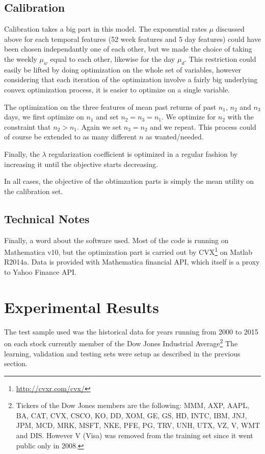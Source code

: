 \documentclass[11pt,fleqn]{article}
\begin{document}
\subsection{Calibration}

Calibration takes a big part in this model. The exponential rates $\mu$ discussed above
for each temporal features (52 week features and 5 day features) could have been chosen
independantly one of each other, but we made the choice of taking the weekly $\mu_w$ equal
to each other, likewise for the day $\mu_d$. This restriction could easily be lifted by
doing optimization on the whole set of variables, however considering that each iteration
of the optimization involve a fairly big underlying convex optimization process, it is
easier to optimize on a single variable.

The optimization on the three features of mean past returns of past $n_1$, $n_2$ and $n_3$
days, we first optimize on $n_1$ and set $n_2=n_3=n_1$. We optimize for $n_2$ with the
constraint that $n_2>n_1$. Again we set $n_3=n_2$ and we repeat. This process could of
course be extended to as many different $n$ as wanted/needed. 

Finally, the $\lambda$ regularization coefficient is optimized in a regular fashion by
increasing it until the objective starts decreasing. 

In all cases, the objective of the obtimzation parts is simply the mean utility on the
calibration set.



\subsection{Technical Notes}

Finally, a word about the software used. Most of the code is running on Mathematica v10,
but the optimization part is carried out by CVX\footnote{\url{http://cvxr.com/cvx/}} on
Matlab R2014a. Data is provided with Mathematica financial API, which itself is a proxy to
Yahoo Finance API. 


\section{Experimental Results}

The test sample used was the historical data for years running from 2000 to 2015 on each
stock currently member of the Dow Jones Industrial Average\footnote{Tickers of the Dow
  Jones members are the following: MMM, AXP, AAPL, BA, CAT, CVX, CSCO, KO, DD, XOM, GE,
  GS, HD, INTC, IBM, JNJ, JPM, MCD, MRK, MSFT, NKE, PFE, PG, TRV, UNH, UTX, VZ, V, WMT and
  DIS.  However V (Visa) was removed from the training set since it went public only in
  2008.} The learning, validation and testing sets were setup as described in the previous
section. 
\end{document}
